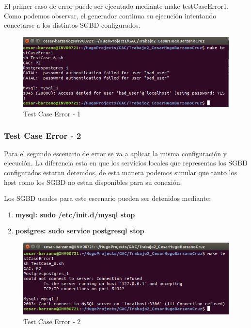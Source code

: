 \documentclass[a4paper,11pt]{book}
\begin{document}
El primer caso de error puede ser ejecutado mediante make testCaseError1. Como podemos observar, el generador continua su ejecución intentando conectarse a los distintos SGBD configurados. 

\begin{figure}[H]  
\centering 
\includegraphics[scale=0.35]{imagenes/TestCase6_1.png}
\caption{ Test Case Error - 1 }  
\end{figure}

\subsubsection{Test Case Error - 2}

Para el segundo escenario de error se va a aplicar la misma configuración y ejecución. La  diferencia esta en que los servicios locales que representas los SGBD configurados estaran detenidos, de esta manera podemos simular que tanto los host como los SGBD no estan disponibles para su conexión. 

Los SGBD usados para este escenario pueden ser detenidos mediante: 
\begin{enumerate}
\item \textbf{mysql: sudo /etc/init.d/mysql stop }
\item \textbf{postgres: sudo service postgresql stop}
\end{enumerate}

\begin{figure}[H]  
\centering 
\includegraphics[scale=0.35]{imagenes/TestCase6_2.png}
\caption{ Test Case Error - 2 }  
\end{figure}
\end{document}
